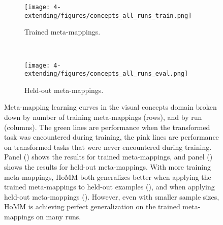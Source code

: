 \begin{figure}[p]
\centering
\begin{subfigure}{\textwidth}
\centering
\texttt{[image: 4-extending/figures/concepts\_all\_runs\_train.png]}
\caption{Trained meta-mappings.}\label{fig:app_extending:concepts_all_runs:train}
\end{subfigure}\\
\begin{subfigure}{\textwidth}
\centering
\texttt{[image: 4-extending/figures/concepts\_all\_runs\_eval.png]}
\caption{Held-out meta-mappings.}\label{fig:app_extending:concepts_all_runs:eval}
\end{subfigure}
\caption[Visual concept learning curves by run.]{Meta-mapping learning curves in the visual concepts domain broken down by number of training meta-mappings (rows), and by run (columns). The green lines are performance when the transformed task was encountered during training, the pink lines are performance on transformed tasks that were never encountered during training. Panel () shows the results for trained meta-mappings, and panel () shows the results for held-out meta-mappings. With more training meta-mappings, HoMM both generalizes better when applying the trained meta-mappings to held-out examples (), and when applying held-out meta-mappings (). However, even with smaller sample sizes, HoMM is achieving perfect generalization on the trained meta-mappings on many runs.} \label{fig:app_extending:concepts_all_runs}
\end{figure}

